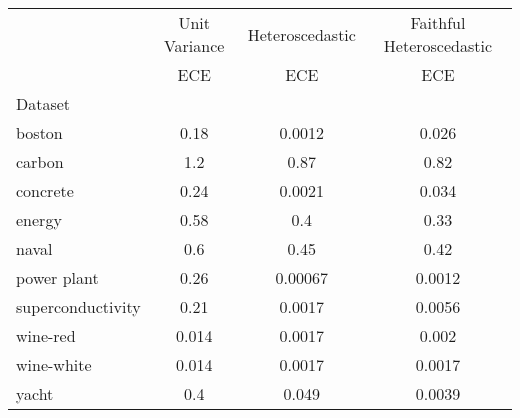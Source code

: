 \begin{tabular}{l|c|c|c}
\toprule
{} & {Unit Variance} & {Heteroscedastic} & {Faithful Heteroscedastic} \\
{} & {ECE} & {ECE} & {ECE} \\
{Dataset} & {} & {} & {} \\
\midrule
boston & 0.18 & 0.0012 & 0.026 \\
carbon & 1.2 & 0.87 & 0.82 \\
concrete & 0.24 & 0.0021 & 0.034 \\
energy & 0.58 & 0.4 & 0.33 \\
naval & 0.6 & 0.45 & 0.42 \\
power plant & 0.26 & 0.00067 & 0.0012 \\
superconductivity & 0.21 & 0.0017 & 0.0056 \\
wine-red & 0.014 & 0.0017 & 0.002 \\
wine-white & 0.014 & 0.0017 & 0.0017 \\
yacht & 0.4 & 0.049 & 0.0039 \\
\bottomrule
\end{tabular}
